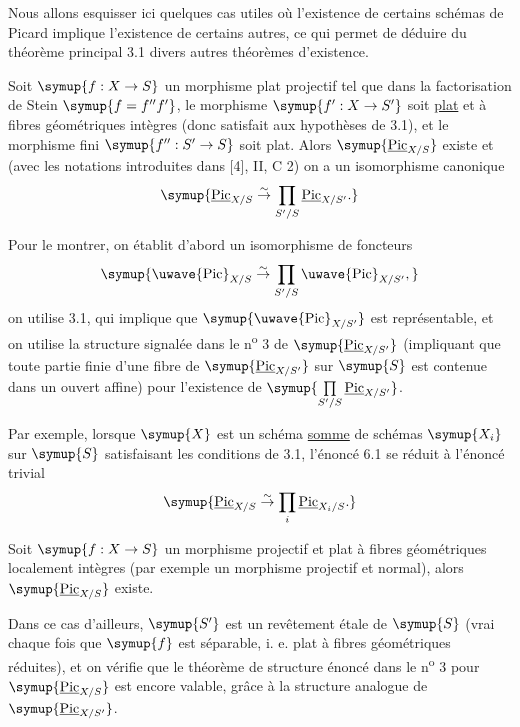 
Nous allons esquisser ici quelques cas utiles où l'existence de certains
schémas de Picard implique l'existence de certains autres, ce qui permet de
déduire du théorème principal 3.1 divers autres théorèmes d'existence.

 Soit $\symup{f:X\to S}$ un morphisme plat
projectif tel que dans la factorisation de Stein $\symup{f=f''f'}$, le morphisme
$\symup{f':X\to S'}$ soit \uline{plat} et à fibres géométriques intègres (donc
satisfait aux hypothèses de 3.1), et le morphisme fini
$\symup{f'':S'\to S}$ soit plat. Alors $\symup{\underline{\operatorname{Pic}}_{X/S}}$ existe et
(avec les notations introduites dans [4], II, C 2) on a un isomorphisme
canonique
\[
\symup{\underline{\operatorname{Pic}}_{X/S}\overset{\sim}{\to}
\prod\limits_{S'/S}\underline{\operatorname{Pic}}_{X/S'}.}
\]

Pour le montrer, on établit d'abord un isomorphisme de foncteurs
\[
\symup{\text{\uwave{Pic}}_{X/S}\overset{\sim}{\to}
\prod\limits_{S'/S}\text{\uwave{Pic}}_{X/S'},}
\]
on utilise 3.1, qui implique que $\symup{\text{\uwave{Pic}}_{X/S'}}$ est représentable,
et on utilise la structure signalée dans le n\textsuperscript{o} 3 de
$\symup{\underline{\operatorname{Pic}}_{X/S'}}$ (impliquant que toute partie finie d'une fibre de
$\symup{\underline{\operatorname{Pic}}_{X/S'}}$ sur $\symup{S}$ est contenue dans un ouvert affine) pour
l'existence de $\symup{\prod\limits_{S'/S}\underline{\operatorname{Pic}}_{X/S'}}$.

Par exemple, lorsque $\symup{X}$ est un schéma \uline{somme} de schémas $\symup{X_i}$ sur $\symup{S}$
satisfaisant les conditions de 3.1, l'énoncé 6.1 se réduit à l'énoncé trivial
\[
\symup{\underline{\operatorname{Pic}}_{X/S}\overset{\sim}{\to}
\prod\limits_i\underline{\operatorname{Pic}}_{X_i/S}.}
\]

 Soit $\symup{f:X\to S}$ un morphisme projectif et
plat à fibres géométriques localement intègres (par exemple un morphisme
projectif et normal), alors $\symup{\underline{\operatorname{Pic}}_{X/S}}$ existe.

Dans ce cas d'ailleurs, $\symup{S'}$ est un revêtement étale de $\symup{S}$ (vrai chaque fois
que $\symup{f}$ est séparable, i. e. plat à fibres géométriques réduites), et on vérifie
que le théorème de structure énoncé dans le n\textsuperscript{o} 3 pour
$\symup{\underline{\operatorname{Pic}}_{X/S}}$ est encore valable, grâce à la structure analogue
de $\symup{\underline{\operatorname{Pic}}_{X/S'}}$.

